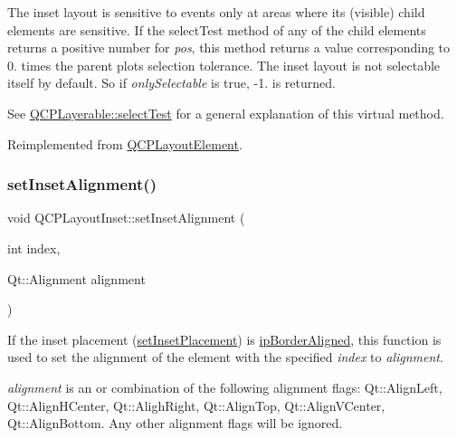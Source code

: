 The inset layout is sensitive to events only at areas where its (visible) child elements are sensitive. If the select\+Test method of any of the child elements returns a positive number for {\itshape pos}, this method returns a value corresponding to 0. times the parent plot\textquotesingle{}s selection tolerance. The inset layout is not selectable itself by default. So if {\itshape only\+Selectable} is true, -\/1. is returned.

See \hyperlink{class_q_c_p_layerable_a04db8351fefd44cfdb77958e75c6288e}{Q\+C\+P\+Layerable\+::select\+Test} for a general explanation of this virtual method. 

Reimplemented from \hyperlink{class_q_c_p_layout_element_ae97f483cccedadbf18ea4525ef240ee4}{Q\+C\+P\+Layout\+Element}.

\mbox{\label{class_q_c_p_layout_inset_a62882a4f9ad58bb0f53da12fde022abe}} 
\subsubsection{\texorpdfstring{set\+Inset\+Alignment()}{setInsetAlignment()}}
{\footnotesize\ttfamily void Q\+C\+P\+Layout\+Inset\+::set\+Inset\+Alignment (\begin{DoxyParamCaption}\item[{int}]{index,  }\item[{Qt\+::\+Alignment}]{alignment }\end{DoxyParamCaption})}

If the inset placement (\hyperlink{class_q_c_p_layout_inset_a63298830744d5d8c5345511c00fd2144}{set\+Inset\+Placement}) is \hyperlink{class_q_c_p_layout_inset_a8b9e17d9a2768293d2a7d72f5e298192aa81e7df4a785ddee2229a8f47c46e817}{ip\+Border\+Aligned}, this function is used to set the alignment of the element with the specified {\itshape index} to {\itshape alignment}.

{\itshape alignment} is an or combination of the following alignment flags\+: Qt\+::\+Align\+Left, Qt\+::\+Align\+H\+Center, Qt\+::\+Aligh\+Right, Qt\+::\+Align\+Top, Qt\+::\+Align\+V\+Center, Qt\+::\+Align\+Bottom. Any other alignment flags will be ignored. \mbox{\label{class_q_c_p_layout_inset_a63298830744d5d8c5345511c00fd2144}} 
